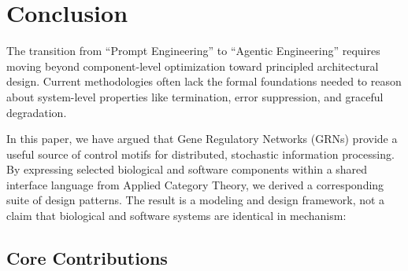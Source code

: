 \section{Conclusion}\label{sec:conclusion}

The transition from ``Prompt Engineering'' to ``Agentic Engineering'' requires moving beyond component-level
optimization toward principled architectural design. Current methodologies often lack the formal foundations
needed to reason about system-level properties like termination, error suppression, and graceful degradation.

In this paper, we have argued that Gene Regulatory Networks (GRNs) provide a useful source of control motifs
for distributed, stochastic information processing. By expressing selected biological and software components
within a shared interface language from Applied Category Theory, we derived a corresponding suite of design
patterns. The result is a modeling and design framework, not a claim that biological and software systems are
identical in mechanism:

\subsection*{Core Contributions}

